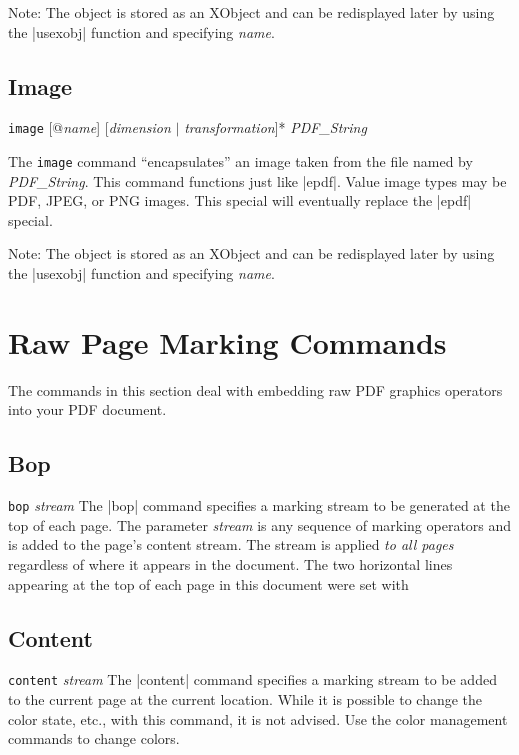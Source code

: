 {Note: The object is stored as an XObject and can be redisplayed later by using the
|usexobj| function and specifying {\it name}.

\example
\begintt
{}
\endtt

\subsection{Image}
\syntax
{\tt image} [@{\it name}] [{\it dimension} $\vert$ {\it transformation}]*  {\it PDF\_String}

\description
The {\tt image} command ``encapsulates'' an image
taken from the file named by {\it PDF\_String}.
This command functions just like |epdf|.  Value
image types may be PDF, JPEG, or PNG images.
This special will eventually replace the |epdf| special.

Note: The object is stored as an XObject and can be redisplayed later by using the
|usexobj| function and specifying {\it name}.

\section{Raw Page Marking Commands}
The commands in this section deal with embedding
raw PDF graphics operators into your PDF document.

\subsection{Bop}
\syntax
{\tt bop} {\it stream}
\description
The |bop| command specifies a marking
stream to be generated at the top of each page.
The parameter {\it stream} is any sequence
of marking operators and is added to the page's content stream.  
The stream is applied {\it to all pages} regardless
of where it appears in the document.
\example  The two horizontal lines appearing
at the top of each page in this document
were set with
\begintt
{}
\endtt
{}

\subsection{Content}
\syntax
{\tt content} {\it stream}
\description
The |content| command specifies a marking
stream to be added to the current page at
the current location.  While it
is possible to change the color
state, etc., with this command, it is
not advised.  Use the color management
commands to change colors.


}
